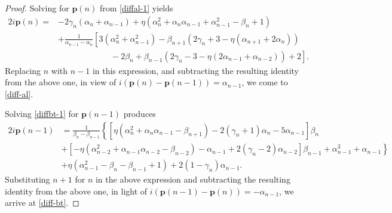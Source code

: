 \documentclass[11pt,a4paper]{article}
\numberwithin{equation}{section}
\begin{document}
	\begin{proof}
Solving for $\textbf{p}(n)$ from \eqref{diffal-1} yields
\begin{align*}
2\mathit{i}\textbf{p}(n)=&-2\gamma_n(\alpha_n+\alpha_{n-1})+\eta(\alpha_n^2+\alpha_n\alpha_{n-1}+\alpha_{n-1}^2-\beta_n+1)\\
&+\frac{1}{\alpha_{n-1}-\alpha_{n}}\left[3\left(\alpha_{n}^2+\alpha_{n-1}^2\right)-\beta_{n+1}\left(2\gamma_n+3-\eta(\alpha_{n+1}+2\alpha_{n})\right)\right.\\
&\left.\qquad\qquad\qquad\;-2\beta_n+\beta_{n-1}\left(2\gamma_n-3-\eta( 2\alpha_{n-1}+\alpha_{n-2})\right)+2\right].
\end{align*}
Replacing $n$ with $n-1$ in this expression, and subtracting the resulting identity from the above one, in view of $\mathit{i}(\textbf{p}(n)-\textbf{p}(n-1))=\alpha_{n-1}$, we come to \eqref{diff-al}.

Solving \eqref{diffbt-1} for $\textbf{p}(n-1)$  produces
\begin{equation*}
\begin{aligned}		 2\mathit{i}\textbf{p}(n-1)&=\frac{1}{\beta_{n}-\beta_{n-1}}\left\{\left[\eta(\alpha_{n}^2+\alpha_{n}\alpha_{n-1}-\beta_{n+1})-2(\gamma_n+1)\alpha_{n}-5\alpha_{n-1}\right]\beta_{n}\right.\\ &\left.+\left[-\eta(\alpha_{n-2}^2+\alpha_{n-1}\alpha_{n-2}-\beta_{n-2})-\alpha_{n-1}+2(\gamma_n-2)\alpha_{n-2}\right]\beta_{n-1}+\alpha_{n-1}^3+\alpha_{n-1}\right\}\\ &+\eta(\alpha_{n-1}^2-\beta_{n}-\beta_{n-1}+1)+2(1-\gamma_n)\alpha_{n-1}.\label{(1.14)}
	\end{aligned}
\end{equation*}
Substituting $n+1$ for $n$ in the above expression and subtracting  the resulting identity from the above one,  in light of $\mathit{i}(\textbf{p}(n-1)-\textbf{p}(n))=-\alpha_{n-1}$, we arrive at \eqref{diff-bt}.
\end{proof}
\end{document}
